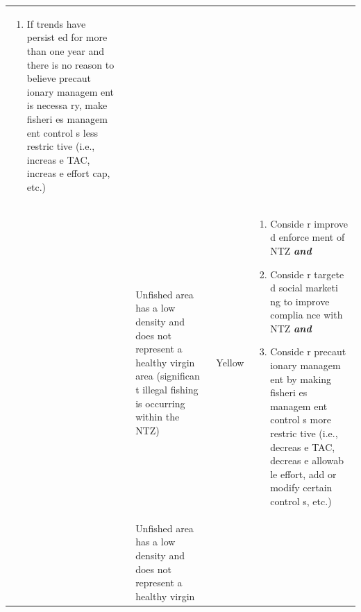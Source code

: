 \documentclass[]{book}
\providecommand{\tightlist}{%
  \setlength{\itemsep}{0pt}\setlength{\parskip}{0pt}}
\begin{document}
\begin{longtable}[]{@{}lllll@{}}
\begin{minipage}[t]{0.19\columnwidth}
\begin{enumerate}
\def\labelenumi{\arabic{enumi}.}
\setcounter{enumi}{1}
\tightlist
\item
  If trends have persist ed for more than one year and there is no
  reason to believe precaut ionary managem ent is necessa ry, make
  fisheri es managem ent control s less restric tive (i.e., increas e
  TAC, increas e effort cap, etc.)
\end{enumerate}\strut
\end{minipage}\tabularnewline
\begin{minipage}[t]{0.19\columnwidth}\raggedright\strut
\strut
\end{minipage} & \begin{minipage}[t]{0.19\columnwidth}\raggedright\strut
\strut
\end{minipage} & \begin{minipage}[t]{0.19\columnwidth}\raggedright\strut
Unfished area has a low density and does not represent a healthy virgin
area (significan t illegal fishing is occurring within the NTZ)\strut
\end{minipage} & \begin{minipage}[t]{0.19\columnwidth}\raggedright\strut
Yellow\strut
\end{minipage} & \begin{minipage}[t]{0.19\columnwidth}\raggedright\strut
\begin{enumerate}
\def\labelenumi{\arabic{enumi}.}
\item
  Conside r improve d enforce ment of NTZ \textbf{\emph{and} }
\item
  Conside r targete d social marketi ng to improve complia nce with NTZ
  \textbf{\emph{and} }
\item
  Conside r precaut ionary managem ent by making fisheri es managem ent
  control s more restric tive (i.e., decreas e TAC, decreas e allowab le
  effort, add or modify certain control s, etc.)
\end{enumerate}\strut
\end{minipage}\tabularnewline
\begin{minipage}[t]{0.19\columnwidth}\raggedright\strut
\strut
\end{minipage} & \begin{minipage}[t]{0.19\columnwidth}\raggedright\strut
\strut
\end{minipage} & \begin{minipage}[t]{0.19\columnwidth}\raggedright\strut
Unfished area has a low density and does not represent a healthy virgin

\end{minipage}
\end{longtable}
\end{document}
